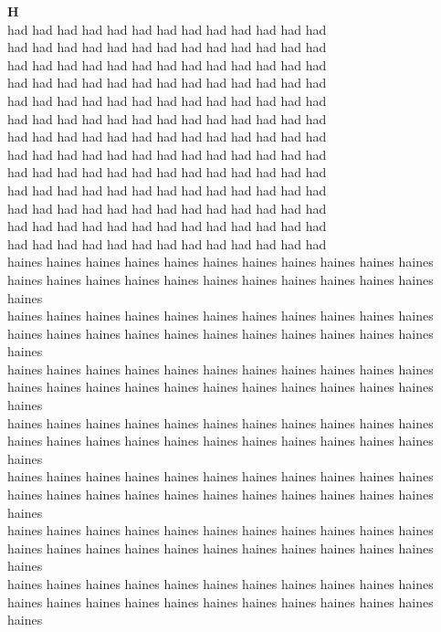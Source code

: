 \vspace{14pt}
\noindent\textbf{\Large H}\\[+12pt]
had had had had had had had had had had had had had\\
had had had had had had had had had had had had had\\
had had had had had had had had had had had had had\\
had had had had had had had had had had had had had\\
had had had had had had had had had had had had had\\
had had had had had had had had had had had had had\\
had had had had had had had had had had had had had\\
had had had had had had had had had had had had had\\
had had had had had had had had had had had had had\\
had had had had had had had had had had had had had\\
had had had had had had had had had had had had had\\
had had had had had had had had had had had had had\\
had had had had had had had had had had had had had\\
haines haines haines haines haines haines haines haines haines haines haines haines haines haines haines haines haines haines haines haines haines haines haines\\
haines haines haines haines haines haines haines haines haines haines haines haines haines haines haines haines haines haines haines haines haines haines haines\\
haines haines haines haines haines haines haines haines haines haines haines haines haines haines haines haines haines haines haines haines haines haines haines\\
haines haines haines haines haines haines haines haines haines haines haines haines haines haines haines haines haines haines haines haines haines haines haines\\
haines haines haines haines haines haines haines haines haines haines haines haines haines haines haines haines haines haines haines haines haines haines haines\\
haines haines haines haines haines haines haines haines haines haines haines haines haines haines haines haines haines haines haines haines haines haines haines\\
haines haines haines haines haines haines haines haines haines haines haines haines haines haines haines haines haines haines haines haines haines haines haines\\
